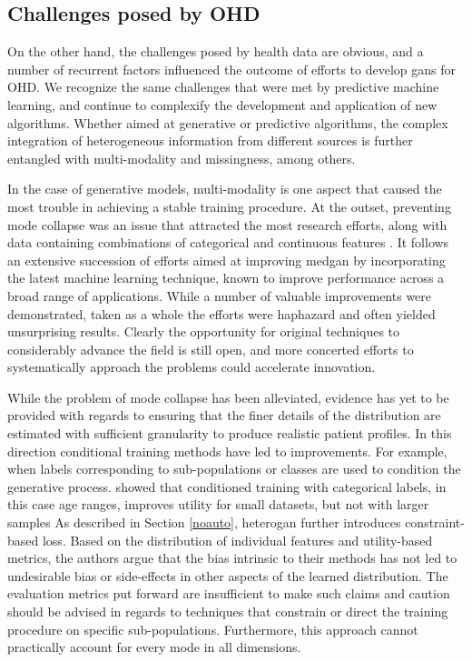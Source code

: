 \subsection{Challenges posed by OHD}
On the other hand, the challenges posed by health data are obvious, and a number of recurrent factors influenced the outcome of efforts to develop \glspl{gan} for OHD. We recognize the same challenges that were met by predictive machine learning, and continue to complexify the development and application of new algorithms. Whether aimed at generative or predictive algorithms, the complex integration of  heterogeneous information from different sources is further entangled with multi-modality and missingness, among others.\par
In the case of generative models, multi-modality is one aspect that  caused the most trouble in achieving a stable training procedure. At the outset, preventing mode collapse was an issue that attracted the most research efforts, along with data containing combinations of categorical and continuous features . It follows an extensive succession of efforts aimed at improving \gls{medgan} by incorporating the latest machine learning technique, known to improve performance across a broad range of applications. While a number of valuable improvements were demonstrated, taken as a whole the efforts were haphazard and often yielded unsurprising results. Clearly the opportunity for original techniques to considerably advance the field is still open, and more concerted efforts to systematically approach the problems could accelerate innovation.\par
While the problem of mode collapse has been alleviated, evidence has yet to be provided with regards to ensuring that the finer details of the distribution are estimated with sufficient granularity to produce realistic patient profiles. In this direction conditional training methods have led to improvements. For example, when labels corresponding to sub-populations or classes are used to condition the generative process. \citeauthor{Zhang2020} showed that conditioned training with categorical labels, in this case age ranges, improves utility for small datasets, but not with larger samples \cite{Zhang2020} As described in Section \ref{noauto}, \gls{heterogan} further introduces constraint-based loss. Based on the distribution of individual features and utility-based metrics, the authors argue that the bias intrinsic to their methods has not led to undesirable bias or side-effects in other aspects of the learned distribution. The evaluation metrics put forward are insufficient to make such claims and caution should be advised in regards to techniques that constrain or direct the training procedure on specific sub-populations. Furthermore, this approach cannot practically account for every mode in all dimensions.

